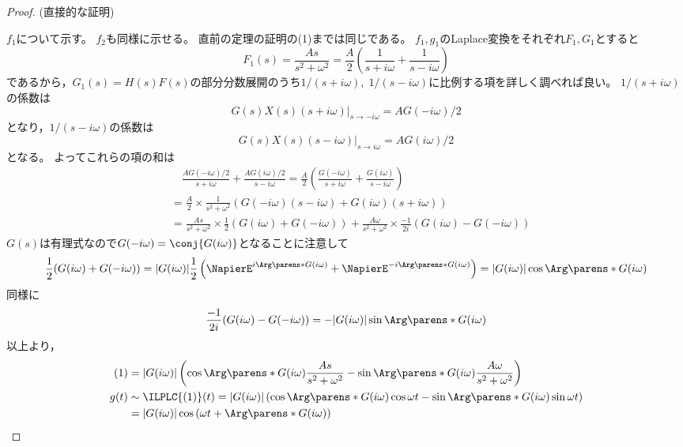             \begin{proof}
                (直接的な証明)
                \quad\par
                $f_1$について示す。
                $f_2$も同様に示せる。
                直前の定理の証明の(1)までは同じである。
                $f_1,g_1$のLaplace変換をそれぞれ$F_1,G_1$とすると
                \[ F_1(s) = \frac{As}{s^2+\omega^2} = \frac{A}{2}\left(\frac{1}{s+i\omega} + \frac{1}{s-i\omega}\right) \]
                であるから，$G_1(s) = H(s)F(s)$の部分分数展開のうち$1/(s+i\omega),\;1/(s-i\omega)$に比例する項を詳しく調べれば良い。
                $1/(s+i\omega)$の係数は
                \[ \left. G(s)X(s)(s+i\omega) \right|_{s\to-i\omega} = AG(-i\omega)/2\]
                となり，$1/(s-i\omega)$の係数は
                \[ \left. G(s)X(s)(s-i\omega) \right|_{s\to i\omega} = AG(i\omega)/2\]
                となる。
                よってこれらの項の和は
                \begin{align}
                    &\quad \frac{AG(-i\omega)/2}{s+i\omega} + \frac{AG(i\omega)/2}{s-i\omega} = \frac{A}{2}\left(\frac{G(-i\omega)}{s+i\omega} + \frac{G(i\omega)}{s-i\omega}\right) \nonumber\\
                    &= \frac{A}{2}\times\frac{1}{s^2+\omega^2}\left(G(-i\omega)(s-i\omega) + G(i\omega)(s+i\omega)\right) \nonumber\\
                    &= \frac{As}{s^2+\omega^2}\times\frac{1}{2}(G(i\omega)+G(-i\omega)) + \frac{A\omega}{s^2+\omega^2}\times\frac{-1}{2i}(G(i\omega)-G(-i\omega))
                \end{align}
                $G(s)$は有理式なので$G(-i\omega) = \conj{G(i\omega)}$となることに注意して
                \[ \frac{1}{2}(G(i\omega)+G(-i\omega)) = |G(i\omega)|\frac{1}{2}\left(\NapierE^{i\Arg\parens*{G(i\omega)}} + \NapierE^{-i\Arg\parens*{G(i\omega)}}\right) = |G(i\omega)|\cos\Arg\parens*{G(i\omega)} \]
                同様に
                \[ \frac{-1}{2i}(G(i\omega)-G(-i\omega)) = -|G(i\omega)|\sin\Arg\parens*{G(i\omega)} \]
                以上より，
                \begin{align*}
                    (1) &= |G(i\omega)|\left(\cos\Arg\parens*{G(i\omega)}\frac{As}{s^2+\omega^2} - \sin\Arg\parens*{G(i\omega)}\frac{A\omega}{s^2+\omega^2} \right) \\
                    g(t) &\sim \ILPLC{(1)}(t) = |G(i\omega)|\left(\cos\Arg\parens*{G(i\omega)}\cos\omega t - \sin\Arg\parens*{G(i\omega)}\sin\omega t \right) \\
                    &= |G(i\omega)|\cos\left(\omega t + \Arg\parens*{G(i\omega)}\right)
                \end{align*}
            \end{proof}